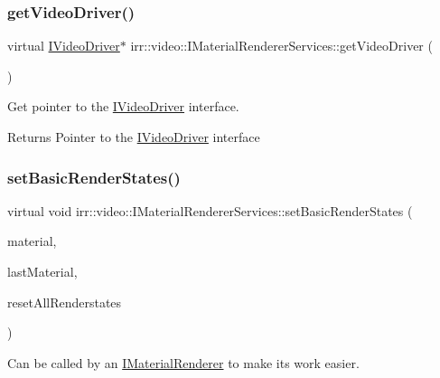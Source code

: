 \subsubsection{\texorpdfstring{get\+Video\+Driver()}{getVideoDriver()}}
{\footnotesize\ttfamily virtual \hyperlink{classirr_1_1video_1_1IVideoDriver}{I\+Video\+Driver}$\ast$ irr\+::video\+::\+I\+Material\+Renderer\+Services\+::get\+Video\+Driver (\begin{DoxyParamCaption}{ }\end{DoxyParamCaption})\hspace{0.3cm}{\ttfamily [pure virtual]}}



Get pointer to the \hyperlink{classirr_1_1video_1_1IVideoDriver}{I\+Video\+Driver} interface. 

\begin{DoxyReturn}{Returns}
Pointer to the \hyperlink{classirr_1_1video_1_1IVideoDriver}{I\+Video\+Driver} interface 
\end{DoxyReturn}
\mbox{\label{classirr_1_1video_1_1IMaterialRendererServices_ab000e24fe3f65fb63b007a37895df3f2}} 
\subsubsection{\texorpdfstring{set\+Basic\+Render\+States()}{setBasicRenderStates()}}
{\footnotesize\ttfamily virtual void irr\+::video\+::\+I\+Material\+Renderer\+Services\+::set\+Basic\+Render\+States (\begin{DoxyParamCaption}\item[{const \hyperlink{classirr_1_1video_1_1SMaterial}{S\+Material} \&}]{material,  }\item[{const \hyperlink{classirr_1_1video_1_1SMaterial}{S\+Material} \&}]{last\+Material,  }\item[{bool}]{reset\+All\+Renderstates }\end{DoxyParamCaption})\hspace{0.3cm}{\ttfamily [pure virtual]}}



Can be called by an \hyperlink{classirr_1_1video_1_1IMaterialRenderer}{I\+Material\+Renderer} to make its work easier. 

